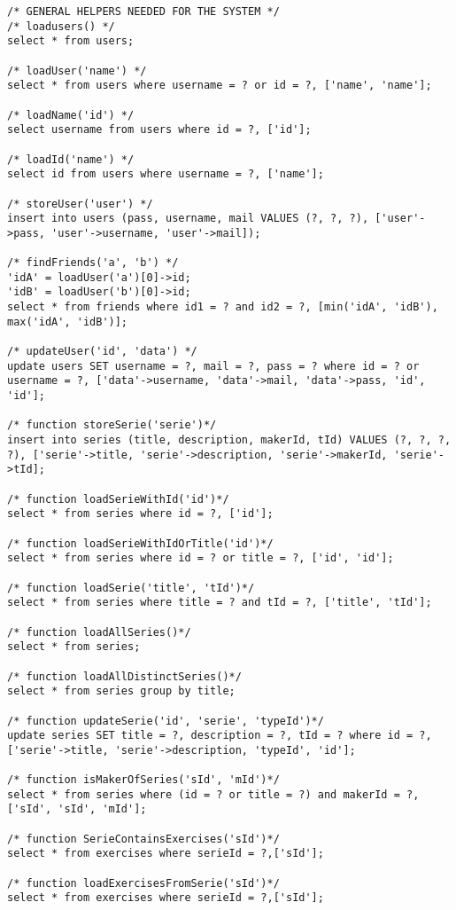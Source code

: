 \begin{lstlisting}    
/* GENERAL HELPERS NEEDED FOR THE SYSTEM */
/* loadusers() */
select * from users;

/* loadUser('name') */
select * from users where username = ? or id = ?, ['name', 'name'];

/* loadName('id') */
select username from users where id = ?, ['id'];

/* loadId('name') */
select id from users where username = ?, ['name'];

/* storeUser('user') */
insert into users (pass, username, mail VALUES (?, ?, ?), ['user'->pass, 'user'->username, 'user'->mail]);

/* findFriends('a', 'b') */
'idA' = loadUser('a')[0]->id;
'idB' = loadUser('b')[0]->id;
select * from friends where id1 = ? and id2 = ?, [min('idA', 'idB'), max('idA', 'idB')];

/* updateUser('id', 'data') */
update users SET username = ?, mail = ?, pass = ? where id = ? or username = ?, ['data'->username, 'data'->mail, 'data'->pass, 'id', 'id'];

/* function storeSerie('serie')*/
insert into series (title, description, makerId, tId) VALUES (?, ?, ?, ?), ['serie'->title, 'serie'->description, 'serie'->makerId, 'serie'->tId];

/* function loadSerieWithId('id')*/
select * from series where id = ?, ['id'];

/* function loadSerieWithIdOrTitle('id')*/
select * from series where id = ? or title = ?, ['id', 'id'];

/* function loadSerie('title', 'tId')*/
select * from series where title = ? and tId = ?, ['title', 'tId'];

/* function loadAllSeries()*/
select * from series;

/* function loadAllDistinctSeries()*/
select * from series group by title;

/* function updateSerie('id', 'serie', 'typeId')*/
update series SET title = ?, description = ?, tId = ? where id = ?,['serie'->title, 'serie'->description, 'typeId', 'id'];

/* function isMakerOfSeries('sId', 'mId')*/
select * from series where (id = ? or title = ?) and makerId = ?,['sId', 'sId', 'mId'];

/* function SerieContainsExercises('sId')*/
select * from exercises where serieId = ?,['sId'];

/* function loadExercisesFromSerie('sId')*/
select * from exercises where serieId = ?,['sId'];


\end{lstlisting}

